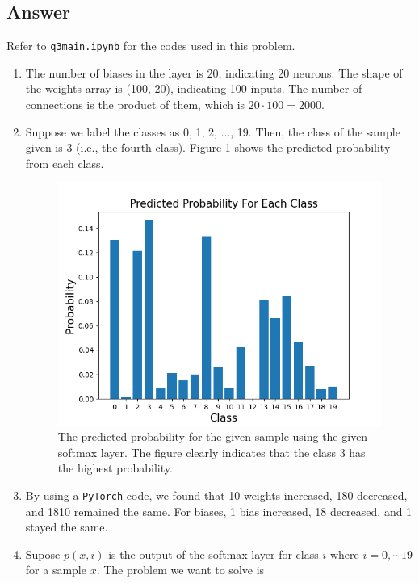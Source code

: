\documentclass[
	12pt, %
]{../Template/fphw}
\begin{document}

\subsection*{Answer} Refer to \verb|q3main.ipynb| for the codes used in this problem.
\begin{enumerate}[label = (\arabic*)]
    \item The number of biases in the layer is $20$, indicating 20 neurons. The shape of the weights array is (100, 20), indicating 100 inputs. The number of connections is the product of them, which is $20\cdot 100=2000$. 
    \item Suppose we label the classes as 0, 1, 2, ..., 19. Then, the class of the sample given is 3 (i.e., the fourth class). Figure \ref{fig:q42} shows the predicted probability from each class.
    \begin{figure}[!htbp]
        \centering
        \includegraphics{HW1/q4-2.png}
        \caption{The predicted probability for the given sample using the given softmax layer. The figure clearly indicates that the class 3 has the highest probability.}
        \label{fig:q42}
    \end{figure}
    \item By using a \verb|PyTorch| code, we found that 10 weights increased, 180 decreased, and 1810 remained the same. For biases, 1 bias increased, 18 decreased, and 1 stayed the same.
    \item Supose $p(x,i)$ is the output of the softmax layer for class $i$ where $i=0,\cdots 19$ for a sample $x$. The problem we want to solve is 

\end{enumerate}
\end{document}
